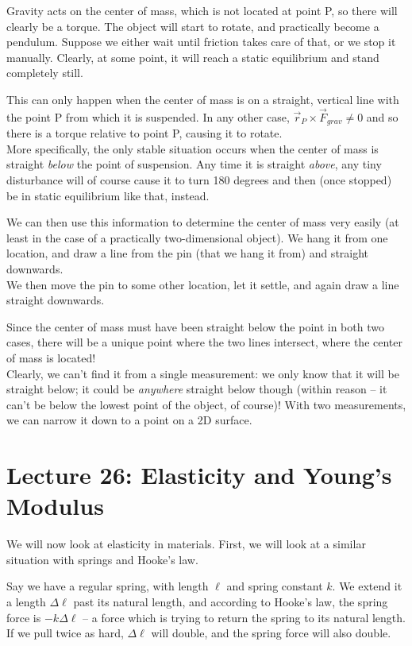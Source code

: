 Gravity acts on the center of mass, which is not located at point P, so there will clearly be a torque. The object will start to rotate, and practically become a pendulum. Suppose we either wait until friction takes care of that, or we stop it manually. Clearly, at some point, it will reach a static equilibrium and stand completely still.

This can only happen when the center of mass is on a straight, vertical line with the point P from which it is suspended. In any other case, $\vec{r}_P \times \vec{F}_{grav} \neq 0$ and so there is a torque relative to point P, causing it to rotate.\\
More specifically, the only stable situation occurs when the center of mass is straight \emph{below} the point of suspension. Any time it is straight \emph{above}, any tiny disturbance will of course cause it to turn 180 degrees and then (once stopped) be in static equilibrium like that, instead.

We can then use this information to determine the center of mass very easily (at least in the case of a practically two-dimensional object). We hang it from one location, and draw a line from the pin (that we hang it from) and straight downwards.\\
We then move the pin to some other location, let it settle, and again draw a line straight downwards.

Since the center of mass must have been straight below the point in both two cases, there will be a unique point where the two lines intersect, where the center of mass is located!\\
Clearly, we can't find it from a single measurement: we only know that it will be straight below; it could be \emph{anywhere} straight below though (within reason -- it can't be below the lowest point of the object, of course)! With two measurements, we can narrow it down to a point on a 2D surface.

\section{Lecture 26: Elasticity and Young's Modulus}

We will now look at elasticity in materials. First, we will look at a similar situation with springs and Hooke's law.

Say we have a regular spring, with length $\ell$ and spring constant $k$. We extend it a length $\Delta \ell$ past its natural length, and according to Hooke's law, the spring force is $-k \Delta \ell$ -- a force which is trying to return the spring to its natural length. If we pull twice as hard, $\Delta \ell$ will double, and the spring force will also double.

